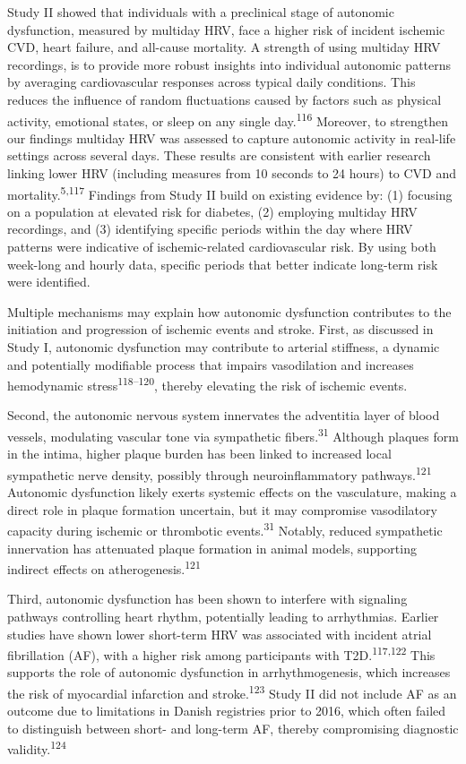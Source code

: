 \documentclass[
  a4paper,
  headsepline=true,
  open=left]{scrbook}
\begin{document}
Study II showed that individuals with a preclinical stage of autonomic
dysfunction, measured by multiday HRV, face a higher risk of incident
ischemic CVD, heart failure, and all-cause mortality. A strength of
using multiday HRV recordings, is to provide more robust insights into
individual autonomic patterns by averaging cardiovascular responses
across typical daily conditions. This reduces the influence of random
fluctuations caused by factors such as physical activity, emotional
states, or sleep on any single day.\textsuperscript{116} Moreover, to
strengthen our findings multiday HRV was assessed to capture autonomic
activity in real-life settings across several days. These results are
consistent with earlier research linking lower HRV (including measures
from 10 seconds to 24 hours) to CVD and
mortality.\textsuperscript{5,117} Findings from Study II build on
existing evidence by: (1) focusing on a population at elevated risk for
diabetes, (2) employing multiday HRV recordings, and (3) identifying
specific periods within the day where HRV patterns were indicative of
ischemic-related cardiovascular risk. By using both week-long and hourly
data, specific periods that better indicate long-term risk were
identified.

Multiple mechanisms may explain how autonomic dysfunction contributes to
the initiation and progression of ischemic events and stroke. First, as
discussed in Study I, autonomic dysfunction may contribute to arterial
stiffness, a dynamic and potentially modifiable process that impairs
vasodilation and increases hemodynamic stress\textsuperscript{118--120},
thereby elevating the risk of ischemic events.

Second, the autonomic nervous system innervates the adventitia layer of
blood vessels, modulating vascular tone via sympathetic
fibers.\textsuperscript{31} Although plaques form in the intima, higher
plaque burden has been linked to increased local sympathetic nerve
density, possibly through neuroinflammatory
pathways.\textsuperscript{121} Autonomic dysfunction likely exerts
systemic effects on the vasculature, making a direct role in plaque
formation uncertain, but it may compromise vasodilatory capacity during
ischemic or thrombotic events.\textsuperscript{31} Notably, reduced
sympathetic innervation has attenuated plaque formation in animal
models, supporting indirect effects on
atherogenesis.\textsuperscript{121}

Third, autonomic dysfunction has been shown to interfere with signaling
pathways controlling heart rhythm, potentially leading to arrhythmias.
Earlier studies have shown lower short-term HRV was associated with
incident atrial fibrillation (AF), with a higher risk among participants
with T2D.\textsuperscript{117,122} This supports the role of autonomic
dysfunction in arrhythmogenesis, which increases the risk of myocardial
infarction and stroke.\textsuperscript{123} Study II did not include AF
as an outcome due to limitations in Danish registries prior to 2016,
which often failed to distinguish between short- and long-term AF,
thereby compromising diagnostic validity.\textsuperscript{124}
\end{document}
